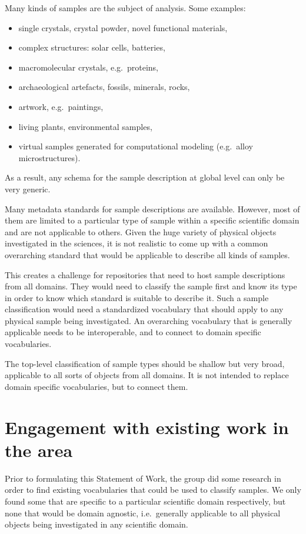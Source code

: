 \documentclass{scrartcl}
\begin{document}
Many kinds of samples are the subject of analysis. Some examples:
\begin{itemize}
\item single crystals, crystal powder, novel functional materials,
\item complex structures: solar cells, batteries,
\item macromolecular crystals, e.g.\ proteins,
\item archaeological artefacts, fossils, minerals, rocks,
\item artwork, e.g.\ paintings,
\item living plants, environmental samples,
\item virtual samples generated for computational modeling (e.g.\
  alloy microstructures).
\end{itemize}

As a result, any schema for the sample description at global level can
only be very generic.

Many metadata standards for sample descriptions are available.
However, most of them are limited to a particular type of sample
within a specific scientific domain and are not applicable to others.
Given the huge variety of physical objects investigated in the
sciences, it is not realistic to come up with a common overarching
standard that would be applicable to describe all kinds of samples.

This creates a challenge for repositories that need to host sample
descriptions from all domains.  They would need to classify the sample
first and know its type in order to know which standard is suitable to
describe it.  Such a sample classification would need a standardized
vocabulary that should apply to any physical sample being
investigated.  An overarching vocabulary that is generally applicable
needs to be interoperable, and to connect to domain specific
vocabularies.

The top-level classification of sample types should be shallow but
very broad, applicable to all sorts of objects from all domains.  It
is not intended to replace domain specific vocabularies, but to
connect them.

\section{Engagement with existing work in the area}

Prior to formulating this Statement of Work, the group did some
research in order to find existing vocabularies that could be used to
classify samples.  We only found some that are specific to a
particular scientific domain respectively, but none that would be
domain agnostic, i.e.\ generally applicable to all physical objects
being investigated in any scientific domain.
\end{document}
